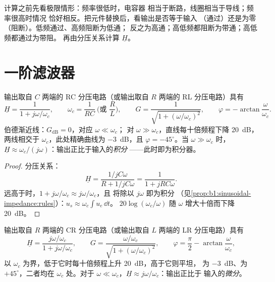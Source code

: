 \begin{method}[滤波器类型的快速判断]\label{met:b1:filters-transfer-functions:nature}
计算之前先看极限情形：频率很低时，电容器
相当于断路，线圈相当于导线；频率很高时情况
恰好相反。把元件替换后，看输出是否等于输入
（通过）还是为零（阻断）。低频通过、高频阻断为低通；
反之为高通；高低频都阻断为带通；高低频都通过为带阻。
再由分压关系计算 $\underline H$。
\end{method}

\section{一阶滤波器}

\begin{proposition}[一阶低通滤波器]\label{prop:b1:filters-transfer-functions:lowpass1}
输出取自 $C$ 两端的 RC 分压电路（或输出取自
$R$ 两端的 RL 分压电路）具有
\[
\underline H = \frac{1}{1 + j\omega/\omega_c}, \qquad
\omega_c = \frac{1}{RC} \ \Big(\text{或 } \frac{R}{L}\Big),
\qquad G = \frac{1}{\sqrt{1 + (\omega/\omega_c)^2}}, \qquad
\varphi = -\arctan\frac{\omega}{\omega_c} .
\]
伯德渐近线：$G_{\mathrm{dB}} = 0$，对应 $\omega \ll \omega_c$；
对 $\omega \gg \omega_c$，直线每十倍频程下降 \qty{20}{dB}，
两线相交于 $\omega_c$，此处精确曲线为 \qty{-3}{dB}，且
$\varphi = -45^\circ$。当 $\omega \gg \omega_c$ 时，$\underline H \approx
\omega_c/(j\omega)$：输出正比于输入的\emph{积分}
——此时即为积分器。
\end{proposition}

\begin{proof}
分压关系：
\[
\underline H = \frac{1/jC\omega}{R + 1/jC\omega} = \frac{1}{1 + jRC\omega} .
\]
远高于时，$1 + j\omega/\omega_c \approx j\omega/\omega_c$，且
将除以 $j\omega$ 即为积分
（见\cref{prop:b1:sinusoidal-impedance:rules}）：$u_s \approx \omega_c\int u_e\,\dd t$。
$20\log(\omega_c/\omega)$ 随 $\omega$ 增大十倍而下降 \qty{20}{dB}。
\end{proof}

\begin{proposition}[一阶高通滤波器]\label{prop:b1:filters-transfer-functions:highpass1}
输出取自 $R$ 两端的 CR 分压电路（或输出取自
$L$ 两端的 LR 分压电路）具有
\[
\underline H = \frac{j\omega/\omega_c}{1 + j\omega/\omega_c},
\qquad G = \frac{\omega/\omega_c}{\sqrt{1 + (\omega/\omega_c)^2}},
\qquad \varphi = \frac{\pi}{2} - \arctan\frac{\omega}{\omega_c},
\]
以 $\omega_c$ 为界，低于它时每十倍频程上升 \qty{20}{dB}，高于它则平坦，
为 \qty{-3}{dB}、为 $+45^\circ$，二者均在 $\omega_c$ 处。对于 $\omega \ll \omega_c$，$\underline H
\approx j\omega/\omega_c$：输出正比于
输入的\emph{微分}。
\end{proposition}

